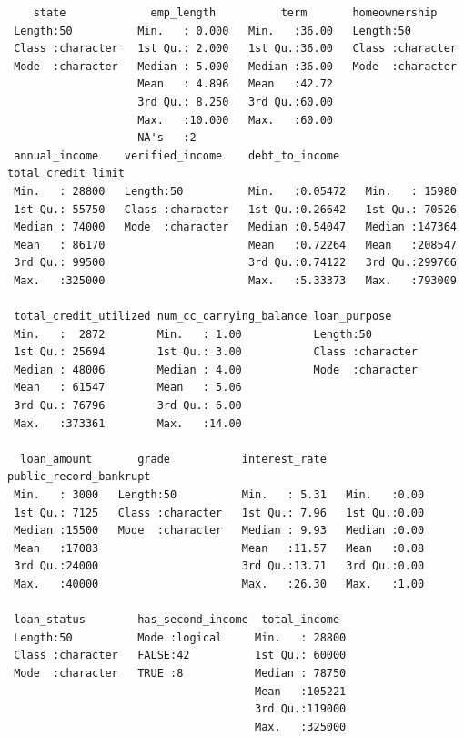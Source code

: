 \documentclass[
  letterpaper,
  DIV=11,
  numbers=noendperiod]{scrreprt}
\begin{document}
\begin{tcolorbox}
\begin{verbatim}
    state             emp_length          term       homeownership     
 Length:50          Min.   : 0.000   Min.   :36.00   Length:50         
 Class :character   1st Qu.: 2.000   1st Qu.:36.00   Class :character  
 Mode  :character   Median : 5.000   Median :36.00   Mode  :character  
                    Mean   : 4.896   Mean   :42.72                     
                    3rd Qu.: 8.250   3rd Qu.:60.00                     
                    Max.   :10.000   Max.   :60.00                     
                    NA's   :2                                          
 annual_income    verified_income    debt_to_income    total_credit_limit
 Min.   : 28800   Length:50          Min.   :0.05472   Min.   : 15980    
 1st Qu.: 55750   Class :character   1st Qu.:0.26642   1st Qu.: 70526    
 Median : 74000   Mode  :character   Median :0.54047   Median :147364    
 Mean   : 86170                      Mean   :0.72264   Mean   :208547    
 3rd Qu.: 99500                      3rd Qu.:0.74122   3rd Qu.:299766    
 Max.   :325000                      Max.   :5.33373   Max.   :793009    
                                                                         
 total_credit_utilized num_cc_carrying_balance loan_purpose      
 Min.   :  2872        Min.   : 1.00           Length:50         
 1st Qu.: 25694        1st Qu.: 3.00           Class :character  
 Median : 48006        Median : 4.00           Mode  :character  
 Mean   : 61547        Mean   : 5.06                             
 3rd Qu.: 76796        3rd Qu.: 6.00                             
 Max.   :373361        Max.   :14.00                             
                                                                 
  loan_amount       grade           interest_rate   public_record_bankrupt
 Min.   : 3000   Length:50          Min.   : 5.31   Min.   :0.00          
 1st Qu.: 7125   Class :character   1st Qu.: 7.96   1st Qu.:0.00          
 Median :15500   Mode  :character   Median : 9.93   Median :0.00          
 Mean   :17083                      Mean   :11.57   Mean   :0.08          
 3rd Qu.:24000                      3rd Qu.:13.71   3rd Qu.:0.00          
 Max.   :40000                      Max.   :26.30   Max.   :1.00          
                                                                          
 loan_status        has_second_income  total_income   
 Length:50          Mode :logical     Min.   : 28800  
 Class :character   FALSE:42          1st Qu.: 60000  
 Mode  :character   TRUE :8           Median : 78750  
                                      Mean   :105221  
                                      3rd Qu.:119000  
                                      Max.   :325000  
                                                      

\end{verbatim}
\end{tcolorbox}
\end{document}
